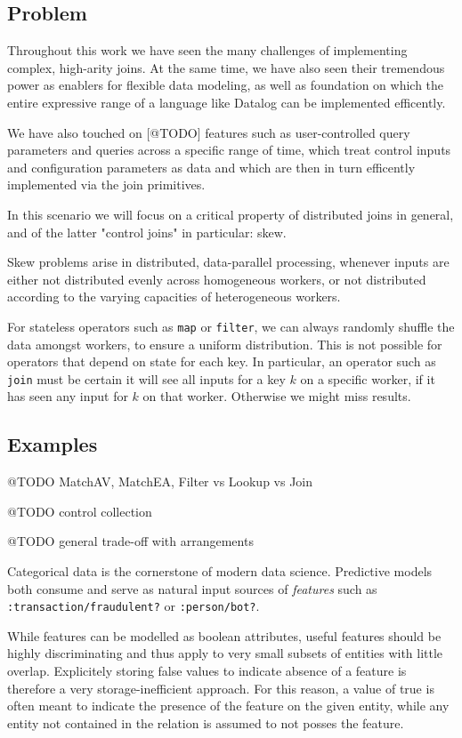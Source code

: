 \documentclass[../catalog.tex]{subfiles}
\begin{document}
\subsection{Problem}

Throughout this work we have seen the many challenges of implementing
complex, high-arity joins. At the same time, we have also seen their
tremendous power as enablers for flexible data modeling, as well as
foundation on which the entire expressive range of a language like
Datalog can be implemented efficently.

We have also touched on [@TODO] features such as user-controlled query
parameters and queries across a specific range of time, which treat
control inputs and configuration parameters as data and which are then
in turn efficently implemented via the join primitives.

In this scenario we will focus on a critical property of distributed
joins in general, and of the latter "control joins" in particular:
skew.

Skew problems arise in distributed, data-parallel processing, whenever
inputs are either not distributed evenly across homogeneous workers,
or not distributed according to the varying capacities of
heterogeneous workers.

For stateless operators such as \texttt{map} or \texttt{filter}, we
can always randomly shuffle the data amongst workers, to ensure a
uniform distribution. This is not possible for operators that depend
on state for each key. In particular, an operator such as
\texttt{join} must be certain it will see all inputs for a key $k$ on
a specific worker, if it has seen any input for $k$ on that
worker. Otherwise we might miss results.

\subsection{Examples}

@TODO MatchAV, MatchEA, Filter vs Lookup vs Join

@TODO control collection

@TODO general trade-off with arrangements

Categorical data is the cornerstone of modern data science. Predictive
models both consume and serve as natural input sources of
\emph{features} such as \texttt{:transaction/fraudulent?} or
\texttt{:person/bot?}.

While features can be modelled as boolean attributes, useful features
should be highly discriminating and thus apply to very small subsets
of entities with little overlap. Explicitely storing false values to
indicate absence of a feature is therefore a very storage-inefficient
approach. For this reason, a value of true is often meant to indicate
the presence of the feature on the given entity, while any entity not
contained in the relation is assumed to not posses the feature.
\end{document}
